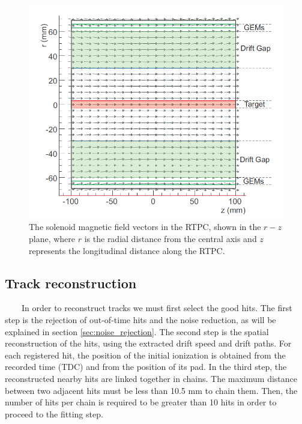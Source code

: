 \begin{figure}[tp]
\centering
\includegraphics[scale=0.40]{fig_rtpc/B_MAP.png}
\caption[]{The solenoid magnetic field vectors in the RTPC, shown in the $r-z$ 
plane, where $r$ is the radial distance from the central axis and $z$ 
represents the longitudinal distance along the RTPC.} \label{fig:B_MAP}
\end{figure}

\subsection{Track reconstruction}
~~~~In order to reconstruct tracks we must first select the good hits. The 
first step is the rejection of out-of-time hits and the noise reduction, as 
will be explained in section \ref{sec:noise_rejection}. The second step is the 
spatial reconstruction of the hits, using the extracted drift speed and drift 
paths. For each registered hit, the position of the initial ionization is 
obtained from the recorded time (TDC) and from the position of its pad.  In the 
third step, the reconstructed nearby hits are linked together in  chains.  The 
maximum distance between two adjacent hits must be less than 10.5 mm to chain 
them. Then, the number of hits per chain is required to be greater than 10 hits 
in order to proceed to the fitting step. \\

